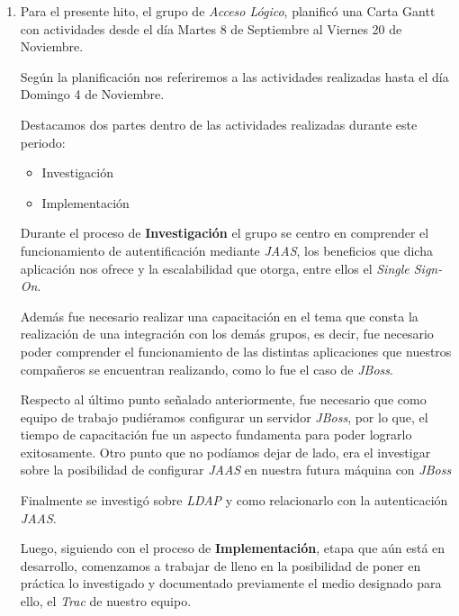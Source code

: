 

\begin{enumerate}
\item Para el presente hito, el grupo de \emph{Acceso Lógico}, planificó una Carta Gantt con
actividades desde el día Martes 8 de Septiembre al Viernes 20 de Noviembre.

Según la planificación nos referiremos a las actividades realizadas hasta el día Domingo
4 de Noviembre.

Destacamos dos partes dentro de las actividades realizadas durante este periodo:
\begin{itemize}
	\item Investigación 
	\item Implementación
\end{itemize}

Durante el proceso de \textbf{Investigación} el grupo se centro en comprender
el funcionamiento de autentificación  mediante \emph{JAAS}, los beneficios que
dicha aplicación nos ofrece y la escalabilidad que otorga, entre ellos el
\emph{Single Sign-On}.

Además fue necesario realizar una capacitación en el tema que consta
la realización de una integración con los demás grupos, es decir, fue necesario
poder comprender el funcionamiento de las distintas aplicaciones que nuestros
compañeros se encuentran realizando, como lo fue el caso de \emph{JBoss}.

Respecto al último punto señalado anteriormente, fue necesario que como
equipo de trabajo pudiéramos configurar un servidor \emph{JBoss},
por lo que, el tiempo de capacitación fue un aspecto fundamenta para
poder lograrlo exitosamente.
Otro punto que no podíamos dejar de lado, era el investigar sobre
la posibilidad de configurar \emph{JAAS} en nuestra futura
máquina con \emph{JBoss}

Finalmente se investigó sobre \emph{LDAP} y como relacionarlo con la autenticación
\emph{JAAS}.

Luego, siguiendo con el proceso de \textbf{Implementación}, etapa que aún está en
desarrollo, comenzamos a trabajar de lleno en la posibilidad de poner en práctica
lo investigado y documentado previamente el medio designado para ello, el \emph{Trac}
de nuestro equipo.


\end{enumerate}
